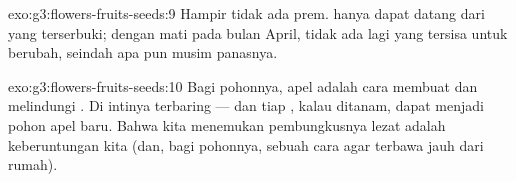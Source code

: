 \begin{solution}{exo:g3:flowers-fruits-seeds:9}
Hampir tidak ada  prem.  hanya dapat datang dari  
yang terserbuki; dengan  mati pada bulan April, tidak ada lagi
yang tersisa untuk berubah, seindah apa pun musim panasnya.
\end{solution}

\begin{solution}{exo:g3:flowers-fruits-seeds:10}
Bagi pohonnya, apel adalah cara membuat dan melindungi . Di intinya
terbaring  --- dan tiap , kalau ditanam, dapat
 menjadi pohon apel baru. Bahwa kita menemukan
pembungkusnya lezat adalah keberuntungan kita (dan, bagi pohonnya,
sebuah cara agar  terbawa jauh dari rumah).
\end{solution}
